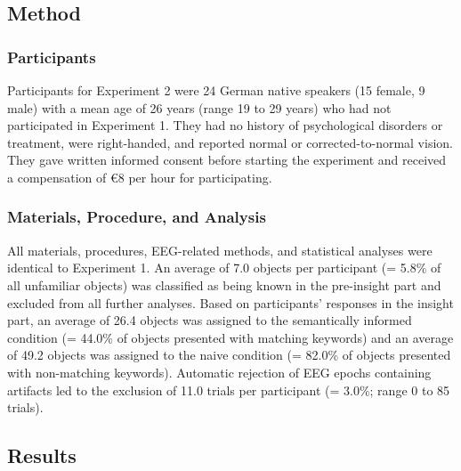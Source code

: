 \documentclass[
  english,
  man,floatsintext]{apa7}
\begin{document}
\hypertarget{method-1}{%
\subsection{Method}\label{method-1}}

\hypertarget{participants-1}{%
\subsubsection{Participants}\label{participants-1}}

Participants for Experiment 2 were 24 German native speakers (15 female, 9 male) with a mean age of 26 years (range 19 to 29 years) who had not participated in Experiment 1. They had no history of psychological disorders or treatment, were right-handed, and reported normal or corrected-to-normal vision. They gave written informed consent before starting the experiment and received a compensation of €8 per hour for participating.

\hypertarget{materials-procedure-and-analysis}{%
\subsubsection{Materials, Procedure, and Analysis}\label{materials-procedure-and-analysis}}

All materials, procedures, EEG-related methods, and statistical analyses were identical to Experiment 1. An average of 7.0 objects per participant (= 5.8\% of all unfamiliar objects) was classified as being known in the pre-insight part and excluded from all further analyses. Based on participants' responses in the insight part, an average of 26.4 objects was assigned to the semantically informed condition (= 44.0\% of objects presented with matching keywords) and an average of 49.2 objects was assigned to the naive condition (= 82.0\% of objects presented with non-matching keywords). Automatic rejection of EEG epochs containing artifacts led to the exclusion of 11.0 trials per participant (= 3.0\%; range 0 to 85 trials).

\hypertarget{results-1}{%
\subsection{Results}\label{results-1}}
\end{document}
